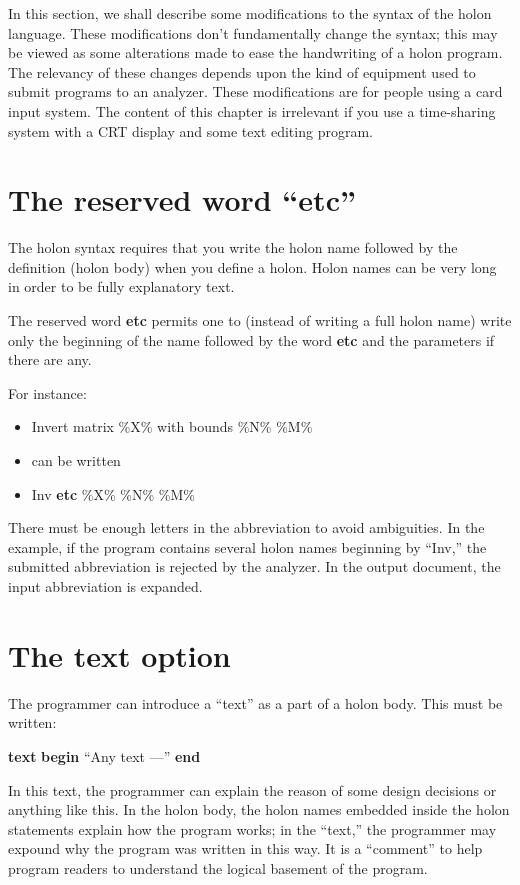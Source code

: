 \documentclass[openany,nobib]{tufte-book}
\newcommand{\kw}[1]{{\bf #1}}
\begin{document}
In this section, we shall describe some modifications to the syntax of the
holon language. These modifications don't fundamentally change the syntax; this
may be viewed as some alterations made to ease the handwriting of a holon
program. The relevancy of these changes depends upon the kind of equipment used
to submit programs to an analyzer. These modifications are for people using a
card input system. The content of this chapter is irrelevant if you use a
time-sharing system with a CRT display and some text editing program.

\section{The reserved word ``etc''}

The holon syntax requires that you write the holon name followed by the
definition (holon body) when you define a holon. Holon names can be very long
in order to be fully explanatory text.

The reserved word \kw{etc} permits one to (instead of writing a full holon
name) write only the beginning of the name followed by the word \kw{etc} and
the parameters if there are any.

For instance:
\begin{itemize}
    \item[] Invert matrix \%X\% with bounds \%N\% \%M\%
    \item[] \quad can be written
    \item[] Inv \kw{etc} \%X\% \%N\% \%M\%
\end{itemize}
There must be enough letters in the abbreviation to avoid ambiguities. In the
example, if the program contains several holon names beginning by ``Inv,'' the
submitted abbreviation is rejected by the analyzer. In the output document, the
input abbreviation is expanded.

\section{The text option}

The programmer can introduce a ``text'' as a part of a holon body. This must be
written:
\begin{center}
    \kw{text} \kw{begin} ``Any text ---'' \kw{end}
\end{center}
In this text, the programmer can explain the reason of some design decisions or
anything like this. In the holon body, the holon names embedded inside the
holon statements explain how the program works; in the ``text,'' the programmer
may expound why the program was written in this way. It is a ``comment'' to
help program readers to understand the logical basement of the program.
\end{document}
